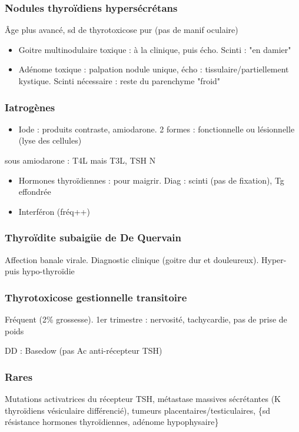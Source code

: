 \documentclass[11pt]{article}
\begin{document}
\subsubsection{Nodules thyroïdiens hypersécrétans}
\label{sec:orga4f05bc}
Âge plus avancé, sd de thyrotoxicose pur (pas de manif oculaire) 
\begin{itemize}
\item Goitre multinodulaire toxique : à la clinique, puis écho. Scinti : "en damier"
\item Adénome toxique : palpation nodule unique, écho : tissulaire/partiellement
kystique. Scinti nécessaire : reste du parenchyme "froid"
\end{itemize}

\subsubsection{Iatrogènes}
\label{sec:org4900010}
\begin{itemize}
\item Iode : produits contraste, amiodarone. 2 formes : fonctionnelle ou lésionnelle
(lyse des cellules)
\end{itemize}
\danger sous amiodarone : T4L \inc mais T3L, TSH N 
\begin{itemize}
\item Hormones thyroïdiennes : pour maigrir. Diag : scinti (pas de fixation), Tg
effondrée
\item Interféron (fréq++)
\end{itemize}

\subsubsection{Thyroïdite subaigüe de De Quervain}
\label{sec:orgadd0b85}
Affection banale virale. Diagnostic clinique (goitre dur et douleureux). Hyper-
puis hypo-thyroïdie

\subsubsection{Thyrotoxicose gestionnelle transitoire}
\label{sec:orgab8335e}
Fréquent (2\% grossesse). 1er trimestre : nervosité, tachycardie, pas de prise de
poids

DD : Basedow (pas Ac anti-récepteur TSH)

\subsubsection{Rares}
\label{sec:org043c337}
Mutations activatrices du récepteur TSH, métastase massives sécrétantes (K
thyroïdiens vésiculaire différencié), tumeurs placentaires/testiculaires, \{sd
résistance hormones thyroïdiennes, adénome hypophysaire\}
\end{document}
